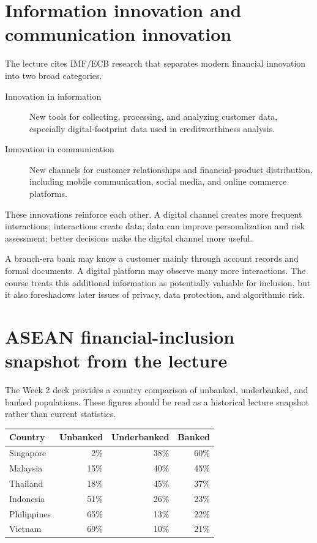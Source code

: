 \section{Information innovation and communication innovation}

The lecture cites IMF/ECB research that separates modern financial innovation into two broad categories.

\begin{description}
  \item[Innovation in information] New tools for collecting, processing, and analyzing customer data, especially digital-footprint data used in creditworthiness analysis.
  \item[Innovation in communication] New channels for customer relationships and financial-product distribution, including mobile communication, social media, and online commerce platforms.
\end{description}

These innovations reinforce each other. A digital channel creates more frequent interactions; interactions create data; data can improve personalization and risk assessment; better decisions make the digital channel more useful.

\begin{intuition}
A branch-era bank may know a customer mainly through account records and formal documents. A digital platform may observe many more interactions. The course treats this additional information as potentially valuable for inclusion, but it also foreshadows later issues of privacy, data protection, and algorithmic risk.
\end{intuition}

\section{ASEAN financial-inclusion snapshot from the lecture}

The Week 2 deck provides a country comparison of unbanked, underbanked, and banked populations. These figures should be read as a historical lecture snapshot rather than current statistics.

\begin{mltable}
\begin{tabular}{@{}lrrr@{}}
\toprule
\rowcolor{MLPaleBlue!92}
Country & Unbanked & Underbanked & Banked \\
\midrule
Singapore & 2\% & 38\% & 60\% \\
Malaysia & 15\% & 40\% & 45\% \\
Thailand & 18\% & 45\% & 37\% \\
Indonesia & 51\% & 26\% & 23\% \\
Philippines & 65\% & 13\% & 22\% \\
Vietnam & 69\% & 10\% & 21\% \\
\bottomrule
\end{tabular}
\end{mltable}

